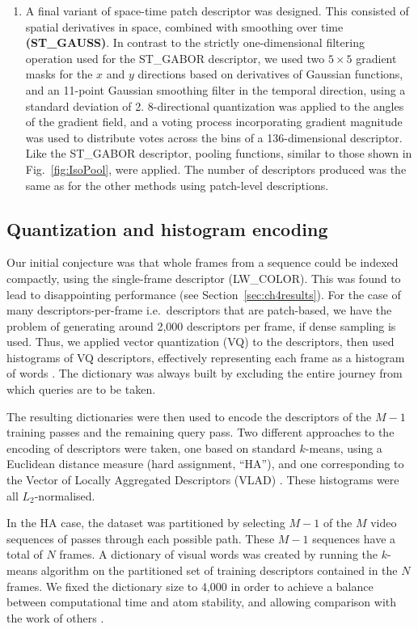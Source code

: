 \begin{enumerate}
\item A final variant of space-time patch descriptor was designed.  This consisted of spatial derivatives in space, combined with smoothing over time \textbf{(ST\_GAUSS)}.  In contrast to the strictly one-dimensional filtering operation used for the ST\_GABOR descriptor, we used two $5\times 5$ gradient masks for the $x$ and $y$ directions based on derivatives of Gaussian functions, and an 11-point Gaussian smoothing filter in the temporal direction, using a standard deviation of 2.  8-directional quantization was applied to the angles of the gradient field, and a voting process incorporating gradient magnitude was used to distribute votes across the bins of a 136-dimensional descriptor.  Like the ST\_GABOR descriptor, pooling functions, similar to those shown in Fig.~\ref{fig:IsoPool}, were applied.  The number of descriptors produced was the same as for the other methods using patch-level descriptions.
\end{enumerate}


\subsection{Quantization and histogram encoding}

Our initial conjecture was that whole frames from a sequence could be indexed compactly, using the single-frame descriptor (LW\_COLOR).  This was found to lead to disappointing performance (see Section~\ref{sec:ch4results}). For the case of many descriptors-per-frame i.e.\ descriptors that are patch-based, we have the problem of generating around 2,000 descriptors per frame, if dense sampling is used.  Thus, we applied vector quantization (VQ) to the descriptors, then used histograms of VQ descriptors, effectively representing each frame as a histogram of words \citep{Csurka2004}. The dictionary was always built by excluding the entire journey from which queries are to be taken.  

The resulting dictionaries were then used to encode the descriptors of the $M-1$ training passes and the remaining query pass. Two different approaches to the encoding of descriptors were taken, one based on standard $k$-means, using a Euclidean distance measure (hard assignment, ``HA''), and one corresponding to the Vector of Locally Aggregated Descriptors (VLAD) \citep{jegou2010aggregating}. These histograms were all $L_2$-normalised.  

In the HA case, the dataset was partitioned by selecting $M-1$ of the $M$ video sequences of passes through each possible path. These $M-1$ sequences have a total of $N$ frames. A dictionary of visual words was created by running the $k$-means algorithm on the partitioned set of training descriptors contained in the $N$ frames.   We fixed the dictionary size to 4,000 in order to achieve a balance between computational time and atom stability, and allowing comparison with the work of others \cite{Chatfield2011}.

